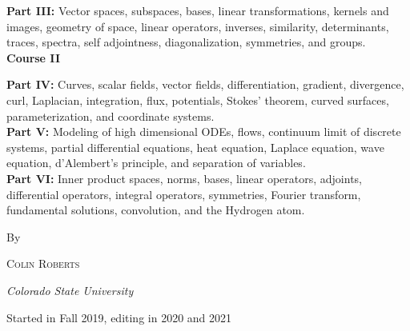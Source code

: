 \begin{titlepage}
    \noindent\textbf{Part III:} Vector spaces, subspaces, bases, linear transformations, kernels and images, geometry of space, linear operators, inverses, similarity, determinants, traces, spectra, self adjointness, diagonalization, symmetries, and groups.   \\%

    \vspace*{1cm}
    \noindent\textbf{\large{Course II}}

	\noindent\textbf{Part IV:} Curves, scalar fields, vector fields, differentiation, gradient, divergence, curl, Laplacian, integration, flux, potentials, Stokes' theorem, curved surfaces, parameterization, and coordinate systems.\\

    \noindent\textbf{Part V:} Modeling of high dimensional ODEs, flows, continuum limit of discrete systems, partial differential equations, heat equation, Laplace equation, wave equation, d'Alembert's principle, and separation of variables.\\

    \noindent\textbf{Part VI:} Inner product spaces, norms, bases, linear operators, adjoints, differential operators, integral operators, symmetries, Fourier transform, fundamental solutions, convolution, and the Hydrogen atom.


	\vspace*{3\baselineskip} %


	By

	\vspace{0.5\baselineskip} %

	{\scshape\Large Colin Roberts \\} %

	\vspace{0.5\baselineskip} %

	\textit{Colorado State University} %

	\vfill %



	\vspace{0.3\baselineskip} %

	Started in Fall 2019, editing in 2020 and 2021 %


\end{titlepage}